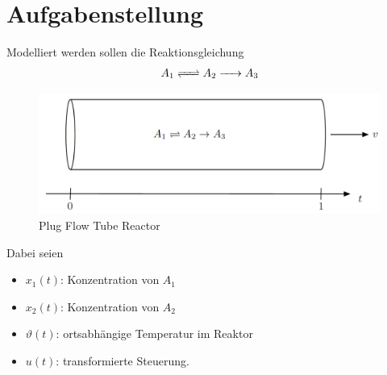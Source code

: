 \chapter{Aufgabenstellung} \label{ch:Aufgabe}
Modelliert werden sollen die Reaktionsgleichung
\begin{align}
	A_1 \ce{<=>} A_2  \ce{->} A_3
\end{align}
\begin{figure}[ht]
	\centering
	\includegraphics[width=1\textwidth]{images/PlugFlowTubeReactor.png}
	\caption{\label{fig:PFTR}Plug Flow Tube Reactor}
\end{figure}

Dabei seien
\begin{itemize}
	\item $x_1(t)$: Konzentration von $A_1$
	\item $x_2(t)$: Konzentration von $A_2$
	\item $\vartheta(t)$: ortsabhängige Temperatur im Reaktor
	\item $u(t)$: transformierte Steuerung.
\end{itemize}

